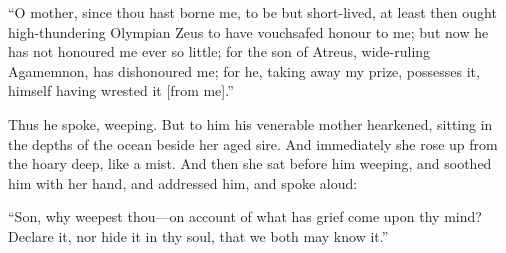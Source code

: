 \documentclass{ransom}
\begin{document}
“O mother, since thou hast borne me, to be but short-lived, at least
then ought high-thundering Olympian Zeus to have vouchsafed honour to
me; but now he has not honoured me ever so little; for the son of
Atreus, wide-ruling Agamemnon, has dishonoured me; for he, taking away
my prize, possesses it, himself having wrested it [from me].”

Thus he spoke, weeping. But to him his venerable mother hearkened,
sitting in the depths of the ocean beside her aged sire. And
immediately she rose up from the hoary deep, like a mist. And then she
sat before him weeping, and soothed him with her hand, and addressed
him, and spoke aloud:

“Son, why weepest thou—on account of what has grief come upon thy mind?
Declare it, nor hide it in thy soul, that we both may know it.”
\end{document}
